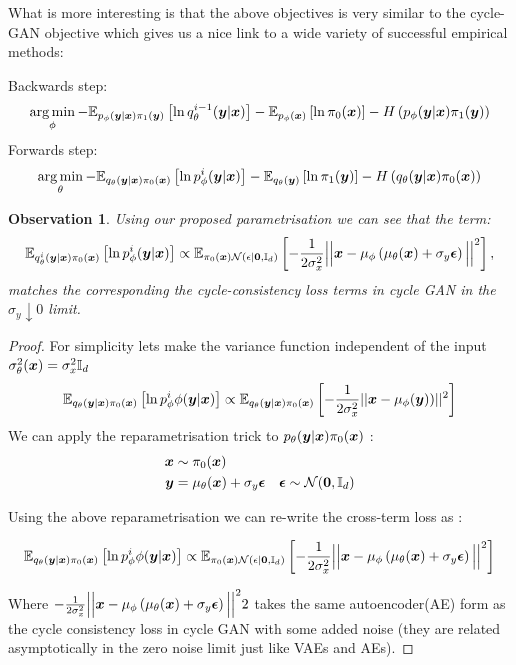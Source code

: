 \documentclass[a4paper,12pt,twoside,openright]{report}
\newtheorem{observation}[theorem]{Observation}
\theoremstyle{definition}
\begin{document}
What is more interesting is that the above objectives is very similar to the cycle-GAN \citep{zhu2017unpaired} objective which gives us a nice link to a wide variety of successful empirical methods:

Backwards step:
\begin{align*}
\operatorname*{arg\,min}_\phi- \mathbb{E}_{p_{\phi}({\bm{y}}|{\bm{x}})\pi_1({\bm{y}})}\left[  \operatorname{ln}  q^{i-1}_{\theta}({\bm{y}}|{\bm{x}})\right] -  \mathbb{E}_{p_{\phi}({\bm{x}})}\left[ \operatorname{ln}  \pi_0({\bm{x}}) \right] - H\left(p_{\phi}({\bm{y}}|{\bm{x}})\pi_1({\bm{y}})\right)
\end{align*}
Forwards step:
\begin{align*}
\operatorname*{arg\,min}_\theta- \mathbb{E}_{q_{\theta}({\bm{y}}|{\bm{x}})\pi_0({\bm{x}})}\left[  \operatorname{ln}  p^i_{\phi}({\bm{y}}|{\bm{x}})\right] -  \mathbb{E}_{q_{\theta}({\bm{y}})}\left[ \operatorname{ln}  \pi_1({\bm{y}}) \right] - H\left(q_{\theta}({\bm{y}}|{\bm{x}})\pi_0({\bm{x}})\right)
\end{align*}

\begin{observation}\label{obs:cycle}
Using our proposed parametrisation we can see that the term:
$$\mathbb{E}_{q^i_{\theta}({\bm{y}}|{\bm{x}})\pi_0({\bm{x}})}\left[  \operatorname{ln}  p^i_{\phi}({\bm{y}}|{\bm{x}})\right] \propto \mathbb{E}_{\pi_0({\bm{x}})\mathcal{N}(\epsilon|\textbf{0},{\mathbb{I}_d} )}\left[  -  \frac{1}{2\sigma_x^2}\Big|\Big|{\bm{x}}- \mu_\phi\left(\mu_\theta({\bm{x}}) + \sigma_y \bm{\epsilon}\right) \Big|\Big|^2\right],$$
matches the corresponding the cycle-consistency loss terms in cycle GAN \cite{zhu2017unpaired} in the $\sigma_y \downarrow 0$ limit.
\end{observation}
\begin{proof}

For simplicity lets make the variance function independent of the input $\sigma^2_{\theta}({\bm{x}}) = \sigma_{x}^2 {\mathbb{I}_d}$ 
\begin{align*}
\mathbb{E}_{q_{\theta}({\bm{y}}|{\bm{x}})\pi_0({\bm{x}})}\left[  \operatorname{ln}  p^i_{\phi}{\phi}({\bm{y}}|{\bm{x}})\right] \propto \mathbb{E}_{q_{\theta}({\bm{y}}|{\bm{x}})\pi_0({\bm{x}})}\left[  -  \frac{1}{2\sigma_x^2}||{\bm{x}}- {\mu}_{\phi}({\bm{y}}))||^2\right]
\end{align*}
We can apply the reparametrisation trick \cite{kingma2013auto} to $p_{\theta}({\bm{y}}|{\bm{x}})\pi_0({\bm{x}})$ : 
\begin{align*}
    {\bm{x}} &\sim \pi_0({\bm{x}}) \\
    {\bm{y}} &= {\mu}_{\theta}({\bm{x}}) + \sigma_y \bm{\epsilon} \quad \bm{\epsilon} \sim \mathcal{N}(\textbf{0}, {\mathbb{I}_d})
\end{align*}

Using the above reparametrisation we can re-write the cross-term loss as : 

\begin{align*}
 \mathbb{E}_{q_{\theta}({\bm{y}}|{\bm{x}})\pi_0({\bm{x}})}\left[  \operatorname{ln}  p^i_{\phi}{\phi}({\bm{y}}|{\bm{x}})\right] \propto \mathbb{E}_{\pi_0({\bm{x}})\mathcal{N}(\epsilon|\textbf{0},{\mathbb{I}_d} )}\left[  -  \frac{1}{2\sigma_x^2}\Big|\Big|{\bm{x}}- \mu_\phi\left(\mu_\theta({\bm{x}}) + \sigma_y \bm{\epsilon}\right) \Big|\Big|^2\right]
\end{align*}

Where $ -  \frac{1}{2\sigma_x^2}\Big|\Big|{\bm{x}}- \mu_\phi\left(\mu_\theta({\bm{x}}) + \sigma_y \bm{\epsilon}\right) \Big|\Big|^22$ takes the same autoencoder(AE) form as the cycle consistency loss in cycle GAN with some added noise (they are related asymptotically in the zero noise limit just like VAEs and AEs).
\end{proof}
\end{document}
